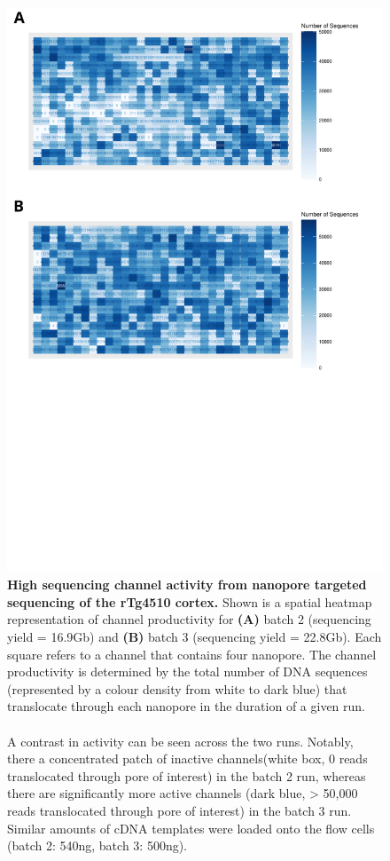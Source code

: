 \begin{figure}[htp]
	\begin{center}
		\includegraphics[page=1,trim={0 13cm 0 0},scale = 0.45]{Figures/ONTTargetedTranscriptome.pdf}
	\end{center}
	\captionsetup{width=0.95\textwidth}
	\caption[ONT sequencing channel activity for targeted profiling of the rTg4510 cortex]%
	{\textbf{High sequencing channel activity from nanopore targeted sequencing of the rTg4510 cortex.} Shown is a spatial heatmap representation of channel productivity for \textbf{(A)} batch 2 (sequencing yield = 16.9Gb) and \textbf{(B)} batch 3 (sequencing yield = 22.8Gb). Each square refers to a channel that contains four nanopore. The channel productivity is determined by the total number of DNA sequences (represented by a colour density from white to dark blue) that translocate through each nanopore in the duration of a given run. \\
	\\
	A contrast in activity can be seen across the two runs. Notably, there a concentrated patch of inactive channels(white box, 0 reads translocated through pore of interest) in the batch 2 run, whereas there are significantly more active channels (dark blue, > 50,000 reads translocated through pore of interest) in the batch 3 run. Similar amounts of cDNA templates were loaded onto the flow cells (batch 2: 540ng, batch 3: 500ng).}
	\label{fig:ont_targetedseq_channel}
\end{figure}

